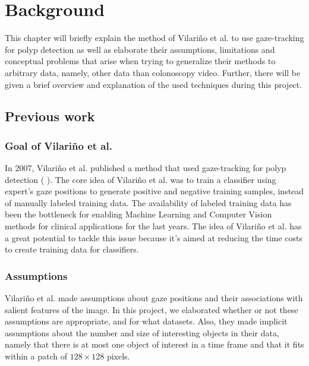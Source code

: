 \chapter{Background}
\label{chap:background}

This chapter will briefly explain the method of Vilari\~no et al. to use gaze-tracking for polyp detection as well as elaborate their assumptions, limitations and conceptual problems that arise when trying to generalize their methods to arbitrary data, namely, other data than colonoscopy video. Further, there will be given a brief overview and explanation of the used techniques during this project.


\section{Previous work}
\subsection{Goal of Vilari\~no et al.}
In 2007, Vilari\~no et al. published a method that used gaze-tracking for polyp detection ( ). The core idea of Vilari\~no et al. was to train a classifier using expert's gaze positions to generate positive and negative training samples, instead of manually labeled training data. 
The availability of labeled training data has been the bottleneck for enabling Machine Learning and Computer Vision methods for clinical applications for the last  years. 
The idea of Vilari\~no et al. has a great potential to tackle this issue because it's aimed at reducing the time costs to create training data for classifiers.

\subsection{Assumptions}
Vilari\~no et al. made assumptions about gaze positions and their associations with salient features of the image. 
In this project, we elaborated whether or not these assumptions are appropriate, and for what datasets. 
Also, they made implicit assumptions about the number and size of interesting objects in their data, namely that there is at most one object of interest in a time frame and that it fits within a patch of $128 \times 128$ pixels.


